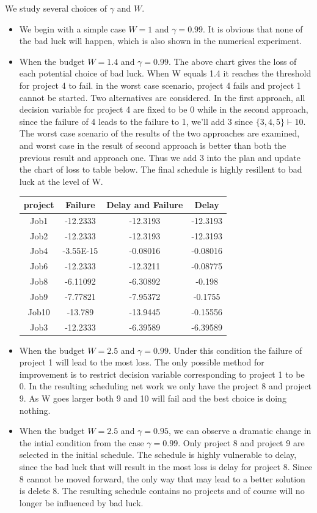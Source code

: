 \documentclass[final,3p,times]{elsarticle}
\begin{document}
We study several choices of $\gamma$ and $W$. 
\begin{itemize}
\item We begin with a simple case $W=1$ and $\gamma=0.99$. It is obvious that none of the bad luck will happen, which is also  shown in the numerical experiment.
\item When the budget $W=1.4$ and $\gamma=0.99$. The above chart gives the loss of each potential choice of bad luck. When W equals 1.4 it reaches the threshold for project 4 to fail. in the worst case scenario, project 4 fails and project 1 cannot be started. Two alternatives are considered. In the first approach, all decision variable for project 4 are fixed to be 0 while in the second approach, since the failure of 4 leads to the failure to 1, we'll add 3  since $\{3,4,5\}\vdash 10$. The worst case scenario of the results of the two approaches are examined, and worst case in the result of second approach is better than both the previous result and approach one. Thus we add 3 into the plan and update the chart of loss to table below. The final schedule is highly resillent to bad luck at the level of W.

\begin{tabular}{|c|c|c|c|}
	\hline
	project & Failure & Delay and Failure & Delay \\
	\hline
	Job1 & -12.2333 & -12.3193 & -12.3193 \\
	\hline
	Job2 & -12.2333 & -12.3193 & -12.3193 \\
	\hline
	Job4 & -3.55E-15 & -0.08016 & -0.08016 \\
	\hline
	Job6 & -12.2333 & -12.3211 & -0.08775 \\
	\hline
	Job8 & -6.11092 & -6.30892 & -0.198 \\
	\hline
	Job9 & -7.77821 & -7.95372 & -0.1755 \\
	\hline
	Job10 & -13.789 & -13.9445 & -0.15556 \\
	\hline
	Job3 & -12.2333 & -6.39589 & -6.39589 \\
	\hline
\end{tabular}

\item When the budget $W=2.5$ and $\gamma=0.99$. Under this condition the failure of project 1 will lead to the most loss. The only possible method for improvement is to restrict decision variable corresponding to project 1 to be 0. In the resulting scheduling net work we only have the project 8 and project 9. As W goes larger both 9 and 10 will fail and the best choice is doing nothing.

\item When the budget $W=2.5$ and $\gamma=0.95$,  we can observe a dramatic change in the intial condition from the case $\gamma=0.99$. Only project 8 and project 9 are selected in the initial schedule. The schedule is highly vulnerable to delay, since the bad luck that will result in the most loss is delay for project 8. Since 8 cannot be moved forward, the only way that may lead to a better solution is delete 8. The resulting schedule contains no projects and of course will no longer be influenced by bad luck.
\end{itemize}
 
\end{document}
